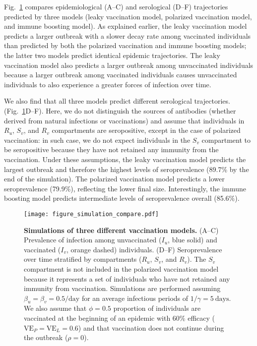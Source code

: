 \documentclass[12pt]{article}
\newcommand{\fref}[1]{Fig.~\ref{fig:#1}}
\newcommand{\VE}{\ensuremath{\textrm{VE}}}
\begin{document}
\fref{simulation} compares epidemiological (A--C) and serological (D--F) trajectories predicted by three models (leaky vaccination model, polarized vaccination model, and immune boosting model).
As explained earlier, the leaky vaccination model predicts a larger outbreak with a slower decay rate among vaccinated individuals than predicted by both the polarized vaccination and immune boosting models;
the latter two models predict identical epidemic trajectories.
The leaky vaccination model also predicts a larger outbreak among unvaccinated individuals because a larger outbreak among vaccinated individuals causes unvaccinated individuals to also experience a greater forces of infection over time.

We also find that all three models predict different serological trajectories. (\fref{simulation}D--F). 
Here, we do not distinguish the sources of antibodies (whether derived from natural infections or vaccinations) and assume that individuals in $R_u$, $S_v$, and $R_v$ compartments are seropositive, except in the case of polarized vaccination:
in such case, we do not expect individuals in the $S_v$ compartment to be seropositive because they have not retained any immunity from the vaccination.
Under these assumptions, the leaky vaccination model predicts the largest outbreak and therefore the highest levels of seroprevalence (89.7\% by the end of the simulation).
The polarized vaccination model predicts a lower seroprevalence (79.9\%), reflecting the lower final size.
Interestingly, the immune boosting model predicts intermediate levels of seroprevalence overall (85.6\%).

\begin{figure}[!th]
\texttt{[image: figure\_simulation\_compare.pdf]}
\caption{
\textbf{Simulations of three different vaccination models.}
(A--C) Prevalence of infection among unvaccinated ($I_u$, blue solid) and vaccinated ($I_v$, orange dashed) individuals.
(D--F) Seroprevalence over time stratified by compartments ($R_u$, $S_v$, and $R_v$).
The $S_v$ compartment is not included in the polarized vaccination model because it represents a set of individuals who have not retained any immunity from vaccination.
Simulations are performed assuming $\beta_u = \beta_v =0.5/\mathrm{day}$ for an average infectious periods of $1/\gamma=5~\mathrm{days}$.
We also assume that $\phi = 0.5$ proportion of individuals are vaccinated at the beginning of an epidemic with 60\% efficacy ($\VE_P=\VE_L=0.6$) and that vaccination does not continue during the outbreak ($\rho = 0$).
\label{fig:simulation}
}
\end{figure}
\end{document}
